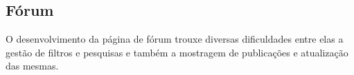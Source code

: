 \subsection{Fórum}
O desenvolvimento da página de fórum trouxe diversas dificuldades entre elas a gestão de filtros e pesquisas e também a mostragem de publicações e atualização das mesmas.


\vspace{10mm}
\begin{figure}[htb]%
  \centering
  \qquad
  \label{fig:72}%
\end{figure}
\vspace{10mm}

\newpage

